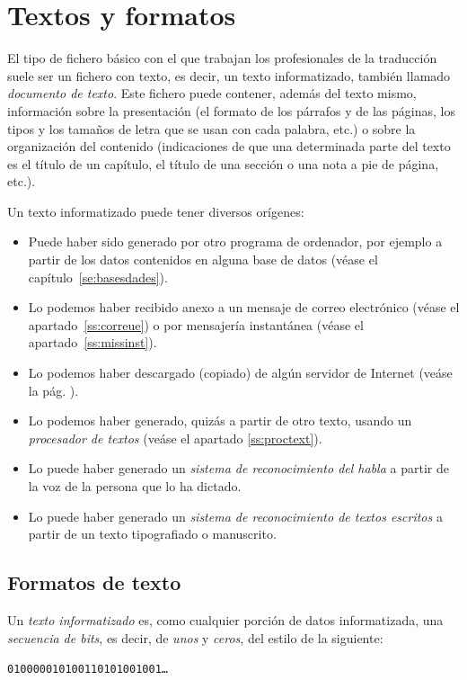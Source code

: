 \chapter{Textos y formatos} \label{se:EPT} 

El tipo de fichero básico con el que trabajan los profesionales de la traducción suele ser un fichero con texto, es decir, un texto informatizado, también llamado \emph{documento de texto}. Este fichero puede contener, además del texto mismo, información sobre la presentación (el formato de los párrafos y de las páginas, los tipos y los tamaños de letra que se usan con cada palabra, etc.) o sobre la organización del contenido (indicaciones de que una determinada parte del texto es el título de un capítulo, el título de una sección o una nota a pie de página, etc.). 

Un texto informatizado puede tener diversos orígenes: \begin{itemize} \item Puede haber sido generado por otro programa de ordenador, por ejemplo a partir de los datos contenidos en alguna base de datos (véase el capítulo~\ref{se:basesdades}). \item Lo podemos haber recibido anexo a un mensaje de correo electrónico (véase el apartado~\ref{ss:correue}) o por mensajería instantánea (véase el apartado~\ref{ss:missinst}). \item Lo podemos haber descargado (copiado) de algún servidor de Internet (veáse la pág. \pageref{pg:ftp}). \item Lo podemos haber generado, quizás a partir de otro texto, usando un \emph{procesador de textos} (veáse el apartado \ref{ss:proctext}). \item Lo puede haber generado un \emph{sistema de reconocimiento del habla} a partir de la voz de la persona que lo ha dictado. \item Lo puede haber generado un \emph{sistema de reconocimiento de textos escritos} a partir de un texto tipografiado o manuscrito. \end{itemize} 

\section{Formatos de texto} \label{ss:formats} Un \emph{texto informatizado} es, como cualquier porción de datos informatizada, una \emph{secuencia de bits}, es decir, de \emph{unos} y \emph{ceros}, del estilo de la siguiente:  \begin{center} \texttt{010000010100110101001001\ldots} \end{center} 

